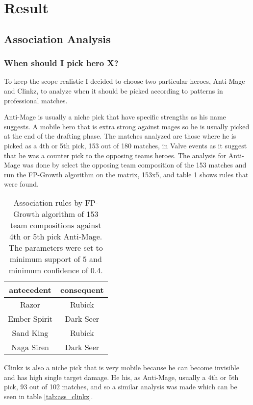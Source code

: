 \documentclass[result.tex]{subfiles}
\begin{document}
\section*{\centering Result}

\subsection*{Association Analysis}

\subsubsection*{When should I pick hero X?}

To keep the scope realistic I decided to choose two particular heroes, Anti-Mage and Clinkz, to analyze when it should be picked according to patterns in professional matches.

Anti-Mage is usually a niche pick that have specific strengths as his name suggests. A mobile hero that is extra strong against mages so he is usually picked at the end of the drafting phase. The matches analyzed are those where he is picked as a 4th or 5th pick, 153 out of 180 matches, in Valve events as it suggest that he was a counter pick to the opposing teams heroes. The analysis for Anti-Mage was done by select the opposing team composition of the 153 matches and run the FP-Growth algorithm on the matrix, 153x5, and table \ref{tab:ass_antimage} shows rules that were found.

\begin{table}[H]
  \centering
  \begin{tabular}{ | c | c | }
    \hline
    antecedent & consequent \\ \hline
    Razor & Rubick \\ \hline
    Ember Spirit & Dark Seer \\ \hline
    Sand King & Rubick \\ \hline
    Naga Siren & Dark Seer  \\
    \hline
  \end{tabular}
  \caption{Association rules by FP-Growth algorithm of 153 team compositions against 4th or 5th pick Anti-Mage. The parameters were set to minimum support of 5 and minimum confidence of 0.4.}
  \label{tab:ass_antimage}
\end{table}

Clinkz is also a niche pick that is very mobile because he can become invisible and has high single target damage. He his, as Anti-Mage, usually a 4th or 5th pick, 93 out of 102 matches, and so a similar analysis was made which can be seen in table \ref{tab:ass_clinkz}.
\end{document}
